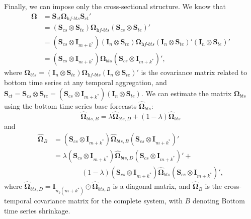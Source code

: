 \documentclass[a4paper,11pt]{article}
\newcommand{\Ivet}{\bm{I}}
\newcommand{\Svet}{\bm{S}}
\newcommand{\Omegavet}{\bm{\Omega}}
\theoremstyle{definition}
\begin{document}
Finally, we can impose only the cross-sectional structure. We know that \begin{align*}
	\Omegavet & = \Svet_{ct}\Omegavet_{\textit{hf-bts}}\Svet_{ct}'                                                                                                                                                   \\
	          & = \left(\Svet_{cs} \otimes \Svet_{te}\right)\Omegavet_{\textit{hf-bts}}\left(\Svet_{cs} \otimes \Svet_{te}\right)'                                                                                   \\
	          & = \left(\Svet_{cs} \otimes \Ivet_{m+k^\ast}\right)\left(\Ivet_n \otimes \Svet_{te}\right)\Omegavet_{\textit{hf-bts}}\left(\Ivet_n \otimes \Svet_{te}\right)'\left(\Ivet_n \otimes \Svet_{te}\right)' \\
	          & = \left(\Svet_{cs} \otimes \Ivet_{m+k^\ast}\right)\Omegavet_{bts}\left(\Svet_{cs} \otimes \Ivet_{m+k^\ast}\right)',
\end{align*}
where $\Omegavet_{bts} = \left(\Ivet_n \otimes \Svet_{te}\right)\Omegavet_{\textit{hf-bts}}\left(\Ivet_n \otimes \Svet_{te}\right)'$ is the covariance matrix related to bottom time series at any temporal aggregation, and $\Svet_{ct} = \Svet_{cs} \otimes \Svet_{te} = \left(\Svet_{cs} \otimes \Ivet_{m+k^\ast}\right)\left(\Ivet_n \otimes \Svet_{te}\right)$. We can estimate the matrix $\Omegavet_{bts}$ using the bottom time series base forecasts $\widehat{\Omegavet}_{bts}$:
$$
	\widehat{\Omegavet}_{bts, B} = \lambda \widehat{\Omegavet}_{bts, D} + (1-\lambda) \widehat{\Omegavet}_{bts}
$$
and
\begin{align*}
	\widehat{\Omegavet}_{B} & = \left(\Svet_{cs} \otimes \Ivet_{m+k^\ast}\right)\widehat{\Omegavet}_{bts, B}\left(\Svet_{cs} \otimes \Ivet_{m+k^\ast}\right)'                       \\
	                        & = \lambda \left(\Svet_{cs} \otimes \Ivet_{m+k^\ast}\right)\widehat{\Omegavet}_{bts, D}\left(\Svet_{cs} \otimes \Ivet_{m+k^\ast}\right)' +             \\
	                        & \qquad \qquad (1-\lambda) \left(\Svet_{cs} \otimes \Ivet_{m+k^\ast}\right)\widehat{\Omegavet}_{bts}\left(\Svet_{cs} \otimes \Ivet_{m+k^\ast}\right)',
\end{align*}
where $\widehat{\Omegavet}_{bts, D} = \Ivet_{n_b(m+k^\ast)}\odot\widehat{\Omegavet}_{bts, B}$ is a diagonal matrix, and $\widehat{\Omegavet}_{B}$ is the cross-temporal covariance matrix for the complete system, with $B$ denoting Bottom time series shrinkage.
\end{document}
